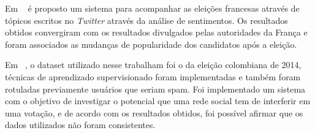 
Em  ~\cite{wegrzyn2012tweets} é proposto um sistema para acompanhar as eleições francesas através de tópicos escritos no \textit{Twitter} através da análise de sentimentos.
Os resultados obtidos convergiram com os resultados divulgados pelas autoridades da França e foram associados as mudanças de popularidade dos candidatos após a eleição.




Em ~\cite{guzman}, o dataset utilizado nesse trabalham foi o da eleição colombiana de 2014, técnicas de aprendizado supervisionado foram implementadas e também foram rotuladas
previamente usuários que seriam spam. Foi implementado um sistema com o objetivo de investigar o potencial que uma rede social tem de interferir em uma votação, e de acordo com 
os resultados obtidos, foi possível afirmar que os dados utilizados não foram consistentes.



